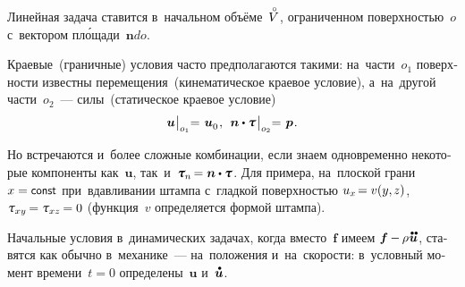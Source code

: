 \begin{otherlanguage}{russian}
Линейная задача ставится в~начальном объёме~\hbox{$\mathcircabove{V}$\hspace{-0.12em}}, ограниченном поверхностью~$o$ с~вектором пл\'{о}щади~${\bm{n} do}$.

Краевые~(граничные) условия часто предполагаются такими: на~\hbox{части~${o_1}$} поверхности известны перемещения~(кинематическое краевое условие), а~на~другой \hbox{части~${o_2}$}~--- силы~(статическое краевое условие) %
\vspace{-0.75em}\begin{equation}
\bm{u} \hspace{0.1ex} \bigr|_{o_1} \hspace{-0.64ex} = \hspace{0.2ex} \bm{u}_{\raisemath{-0.1em}{0}} \hspace{0.16ex} , \:\:
\bm{n} \dotp \mathboldtau \hspace{.2ex} \bigr|_{o_2} \hspace{-0.64ex} = \hspace{.2ex} \bm{p} \hspace{.16ex} .
\vspace{-0.1em}
\end{equation}

Но встречаются и~более сложные комбинации, если знаем одно\-времен\-но некоторые компоненты как~$\bm{u}$, так~и~${\mathboldtau_{\hspace{-0.1ex}n} \hspace{-0.25ex} = \bm{n} \dotp \mathboldtau}$. Для примера, на~плоской грани~${x = \const}$ при~вдавливании штампа с~гладкой поверхностью ${u_x \hspace{-0.32ex} = v (y , \hspace{-0.1ex} z)}$, ${\mathtau_{xy} \hspace{-0.2ex} = \mathtau_{xz} \hspace{-0.2ex} = 0}$ (функция~$v$ определяется формой штампа).

Начальные условия в~динамических задачах, когда вместо~$\bm{f}$ имеем ${\bm{f} \hspace{-0.1ex} - \hspace{-0.1ex} \rho \hspace{0.1ex} \mathdotdotabove{\bm{u}}}$, ставятся как обычно в~механике~--- на~положения и~на~скорости: в~условный момент времени~${t \!=\! 0}$ определены~$\bm{u}$ и~$\mathdotabove{\bm{u}}$.


\end{otherlanguage}
